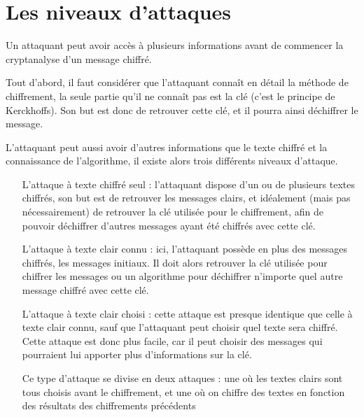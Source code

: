 \section{Les niveaux d'attaques}
Un attaquant peut avoir accès à plusieurs informations avant de
commencer la cryptanalyse d'un message chiffré.

Tout d'abord, il faut considérer que l'attaquant connaît en détail
la méthode de chiffrement, la seule partie qu'il ne connaît pas
est la clé (c'est le principe de
Kerckhoffs). Son but est donc de
retrouver cette clé, et il pourra ainsi déchiffrer le message.

L'attaquant peut aussi avoir d'autres informations que le texte
chiffré et la connaissance de l'algorithme, il existe alors trois
différents niveaux d'attaque.

\begin{itemize}
  \renewcommand{\makelabel}[1]{\sffamily\textbf{#1}}
  \item[L'attaque à texte chiffré seul] :
    l'attaquant dispose d'un ou de plusieurs textes chiffrés, son but
    est de retrouver les messages clairs, et idéalement (mais pas
    nécessairement) de retrouver la clé utilisée pour le chiffrement,
    afin de pouvoir déchiffrer d'autres messages ayant été chiffrés
    avec cette clé.

  \item[L'attaque à texte clair connu] :
    ici, l'attaquant possède en plus des messages chiffrés, les
    messages initiaux. Il doit alors retrouver la clé utilisée pour 
    chiffrer les messages ou un algorithme pour déchiffrer n'importe
    quel autre message chiffré avec cette clé. 

  \item[L'attaque à texte clair choisi] :
    cette attaque est presque identique que celle à texte clair connu,
    sauf que l'attaquant peut choisir quel texte sera chiffré. Cette
    attaque est donc plus facile, car il peut choisir des messages qui
    pourraient lui apporter plus d'informations sur la clé.

    Ce type d'attaque se divise en deux attaques : une où les textes
    clairs sont tous choisis avant le chiffrement, et une où on
    chiffre des textes en fonction des résultats des chiffrements
    précédents

\end{itemize}

